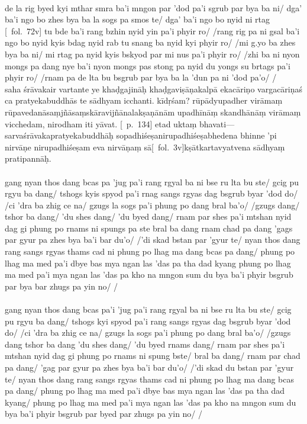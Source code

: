 \documentclass[12pt]{article}
\newcommand{\emdash} {\hspace{0em}—\hspace{0em}}
\begin{document}
\textbf{\TVB}\\
de la rig byed kyi mthar smra ba'i mngon par 'dod pa'i sgrub par bya ba ni/ dga' ba'i ngo bo zhes bya ba la sogs pa smos te/ dga' ba'i ngo bo nyid ni rtag [\TVB\ fol.\ 72v] tu bde ba'i rang bzhin nyid yin pa'i phyir ro/ /rang rig pa ni gsal ba'i ngo bo nyid kyis bdag nyid rab tu snang ba nyid kyi phyir ro/ /mi g.yo ba zhes bya ba ni/ mi rtag pa nyid kyis bskyod par mi nus pa'i phyir ro/ /zhi ba ni nyon mongs pa dang nye ba'i nyon mongs pas stong pa nyid du yongs su brtags pa'i phyir ro/ /rnam pa de lta bu bsgrub par bya ba la 'dun pa ni 'dod pa'o/ /\\

saha śrāvakair vartante ye khaḍgajināḥ khaḍgaviṣāṇakalpā ekacāriṇo vargacāriṇaś\footnoteB{
	vargacāriṇaś] \MS\ (\emph{cf.\ Abhidharmakośabhāṣya}); vanacāriṇaś \EDD 
} ca pratyekabuddhās te sādhyam icchanti.
kīdṛśam?
rūpādyupadher virāmaṃ rūpavedanāsaṃjñāsaṃskāravijñānalakṣaṇānām upadhīnāṃ skandhānāṃ virāmaṃ vicchedam, nirodham iti yāvat.
[\EDD\ p.\ 134] etad uktaṃ bhavati\emdash sarvaśrāvakapratyekabuddhāḥ sopadhiśeṣanirupadhiśeṣabhedena bhinne 'pi nirvāṇe\footnoteB{
	nirvāṇe] \EDD ; nirvāṇa° \MS
} nirupadhiśeṣam eva nirvāṇaṃ sā[\MS\ fol.\ 3v]kṣātkartavyatvena sādhyaṃ pratipannāḥ.\\

\textbf{\TVA}\\
gang nyan thos dang bcas pa 'jug pa'i rang rgyal ba ni bse ru lta bu ste/ gcig pu rgyu ba dang/ tshogs kyis spyod pa'i rnag sangs rgyas dag bsgrub byar 'dod do/ /ci 'dra ba zhig ce na/ gzugs la sogs pa'i phung po dang bral ba'o/ /gzugs dang/ tshor ba dang/ 'du shes dang/ 'du byed dang/ rnam par shes pa'i mtshan nyid dag gi phung po rnams ni spungs pa ste bral ba dang rnam chad pa dang 'gags par gyur pa zhes bya ba'i bar du'o/ /'di skad bstan par 'gyur te/ nyan thos dang rang sangs rgyas thams cad ni phung po lhag ma dang bcas pa dang/ phung po lhag ma med pa'i dbye bas mya ngan las 'das pa tha dad kyang phung po lhag ma med pa'i mya ngan las 'das pa kho na mngon sum du bya ba'i phyir bsgrub par bya bar zhugs pa yin no/ /\\

\textbf{\TVB}\\
gang nyan thos dang bcas pa'i 'jug pa'i rang rgyal ba ni bse ru lta bu ste/ gcig pu rgyu ba dang/ tshogs kyi spyod pa'i rang sangs rgyas dag bsgrub byar 'dod do/ /ci 'dra ba zhig ce na/ gzugs la sogs pa'i phung po dang bral ba'o/ /gzugs dang tshor ba dang 'du shes dang/ 'du byed rnams dang/ rnam par shes pa'i mtshan nyid dag gi phung po rnams ni spung bste/ bral ba dang/ rnam par chad pa dang/ 'gag par gyur pa zhes bya ba'i bar du'o/ /'di skad du bstan par 'gyur te/ nyan thos dang rang sangs rgyas thams cad ni phung po lhag ma dang bcas pa dang/ phung po lhag ma med pa'i dbye bas mya ngan las 'das pa tha dad kyang/ phung po lhag ma med pa'i mya ngan las 'das pa kho na mngon sum du bya ba'i phyir bsgrub par byed par zhugs pa yin no/ /
\end{document}
